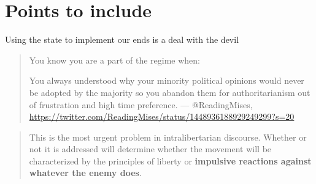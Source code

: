 \documentclass[11pt]{article}
\begin{document}
\section{Points to include}
\label{sec:org1324cd6}
Using the state to implement our ends is a deal with the devil

\begin{quote}
You know you are a part of the regime when:

You always understood why your minority political opinions would never be adopted by the majority so you abandon them for authoritarianism out of frustration and high time preference.
 --- @ReadingMises, \url{https://twitter.com/ReadingMises/status/1448936188929249299?s=20}
\end{quote}

\begin{quote}
This is the most urgent problem in intralibertarian discourse. Whether or not it is addressed will determine whether the movement will be characterized by the principles of liberty or \textbf{impulsive reactions against whatever the enemy does}.
\end{quote}
\end{document}
